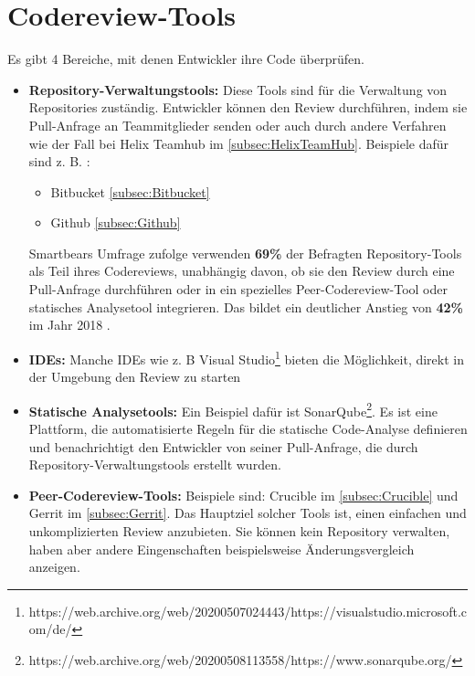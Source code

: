 \section{Codereview-Tools}
\label{sec:Coderview-Tools}

Es gibt 4 Bereiche, mit denen Entwickler ihre Code überprüfen.

\begin{itemize}
	\item \textbf{Repository-Verwaltungstools:} Diese Tools sind für die Verwaltung von Repositories zuständig. Entwickler können den Review durchführen, indem sie Pull-Anfrage an 				Teammitglieder senden oder auch durch andere Verfahren wie der Fall bei Helix Teamhub im \cref{subsec:HelixTeamHub}.
		Beispiele dafür sind z. B. :
		\begin{itemize}
			\item Bitbucket \cref{subsec:Bitbucket}
			\item Github \cref{subsec:Github}
		\end{itemize}
		
		Smartbears Umfrage zufolge verwenden \textbf{69\%} der Befragten Repository-Tools als Teil ihres Codereviews, unabhängig davon, ob sie den Review durch eine Pull-Anfrage 					durchführen oder in ein spezielles Peer-Codereview-Tool oder statisches Analysetool integrieren. Das bildet ein deutlicher Anstieg von \textbf{42\%} im Jahr 2018 							\cite{smartbear}.

	\item \textbf{IDEs:} Manche IDEs wie z. B Visual Studio\footnote{https://web.archive.org/web/20200507024443/https://visualstudio.microsoft.com/de/} bieten die Möglichkeit, direkt in 		der Umgebung den Review zu starten

	\item \textbf{Statische Analysetools:} Ein Beispiel dafür ist SonarQube\footnote{https://web.archive.org/web/20200508113558/https://www.sonarqube.org/}. Es ist eine Plattform, die 			automatisierte Regeln für die statische Code-Analyse definieren und benachrichtigt den Entwickler von seiner Pull-Anfrage, die durch Repository-Verwaltungstools erstellt wurden.

	\item \textbf{Peer-Codereview-Tools:} Beispiele sind: Crucible im \cref{subsec:Crucible} und Gerrit im \cref{subsec:Gerrit}. Das Hauptziel solcher Tools ist, einen einfachen und 				unkomplizierten Review anzubieten. Sie können kein Repository verwalten, haben aber andere Eingenschaften beispielsweise Änderungsvergleich anzeigen.
\end{itemize}

